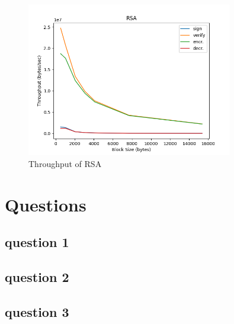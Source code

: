 \documentclass[11pt]{article}
\begin{document}
\begin{figure}
	\centering
	\includegraphics[width=0.8\textwidth]{./plts/rsa.png}
	\caption{Throughput of RSA}
	\label{fig.4: Performance of RSA}
\end{figure}

\section*{Questions}
\subsection*{question 1}
\subsection*{question 2}
\subsection*{question 3}
\end{document}
